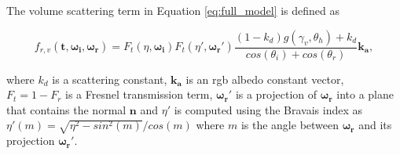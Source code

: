 \documentclass[12pt]{article}
\begin{document}
The volume scattering term in Equation \ref{eq:full_model} is defined as

\begin{equation}
f_{r,v}(\mathbf{t},\boldsymbol{\omega_i},\boldsymbol{\omega_r}) = F_t(\eta, \boldsymbol{\omega_i}) F_t(\eta', \boldsymbol{\omega_r}') \frac{(1-k_d)g(\gamma_v, \theta_h)+k_d}{cos(\theta_i) + cos(\theta_r)} \mathbf{k_a},
\end{equation}

where $k_d$ is a scattering constant, $\mathbf{k_a}$ is an rgb albedo constant vector, $F_t = 1 - F_r$ is a Fresnel transmission term, $\boldsymbol{\omega_r}'$ is a projection of $\boldsymbol{\omega_r}$ into a plane that contains the normal $\mathbf{n}$ and $\eta'$ is computed using the Bravais index \cite{Marschner2003} as $\eta'(m) = \sqrt{\eta^2 - sin^2(m)}  / cos(m)$ where $m$ is the angle between $\boldsymbol{\omega_r}$ and its projection $\boldsymbol{\omega_r}'$.
\end{document}
